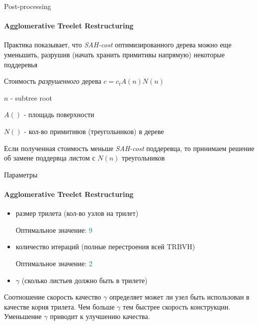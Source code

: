 \begin{frame}{Post-processing}
    \framesubtitle{Agglomerative Treelet Restructuring}

    Практика показывает, что \textit{SAH-cost} оптимизированного дерева можно еще уменьшить,
    разрушив (начать хранить примитивы напрямую) некоторые поддеревья

    \begin{block}{Стоимость \textit{разрушенного} дерева}
        \(
        c = c_t A(n) N(n)
        \)

        $n$ - subtree root

        $A()$ - площадь поверхности

        $N()$ - кол-во примитивов (треугольников) в дереве
    \end{block}
    Если полученная стоимость меньше \textit{SAH-cost} поддеревца, то принимаем решение об замене
    поддервца листом с $N(n)$ треугольников
\end{frame}

\begin{frame}{Параметры}
    \framesubtitle{Agglomerative Treelet Restructuring}
    \begin{itemize}
        \item
            размер трилета (кол-во узлов на трилет)

            Оптимальное значение: \textcolor{teal}{9}
        \item
            количество итераций (полные перестроения всей TRBVH)

            Оптимальное значение: \textcolor{teal}{2}
        \item
            $\gamma$ (сколько листьев должно быть в трилете)
    \end{itemize}

    \begin{block}{Соотношение скорость качество}
        $\gamma$ определяет может ли узел быть использован в качестве корня трилета.
        Чем больше $\gamma$ тем быстрее скорость конструкции. Уменьшение $\gamma$ приводит к улучшению качества.

    \end{block}

\end{frame}

